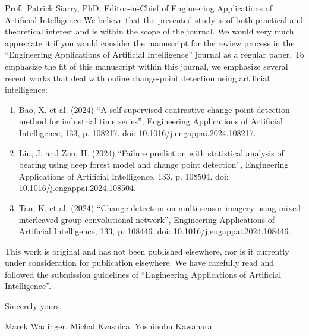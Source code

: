\documentclass{letter}
\begin{document}
\begin{letter}{Prof.~Patrick Siarry, PhD, Editor-in-Chief of Engineering Applications of Artificial Intelligence}
    We believe that the presented study is of both practical and theoretical interest and is within the scope of the journal. We would very much appreciate it if you would consider the manuscript for the review process in the ``Engineering Applications of Artificial Intelligence'' journal as a regular paper. To emphasize the fit of this manuscript within this journal, we emphasize several recent works that deal with online change-point detection using artificial intelligence:
    \begin{enumerate}
        \item Bao, X. et al. (2024) ``A self-supervised contrastive change point detection method for industrial time series'', Engineering Applications of Artificial Intelligence, 133, p. 108217. doi: 10.1016/j.engappai.2024.108217.
        \item Liu, J. and Zuo, H. (2024) ``Failure prediction with statistical analysis of bearing using deep forest model and change point detection'', Engineering Applications of Artificial Intelligence, 133, p. 108504. doi: 10.1016/j.engappai.2024.108504.
        \item Tan, K. et al. (2024) ``Change detection on multi-sensor imagery using mixed interleaved group convolutional network'', Engineering Applications of Artificial Intelligence, 133, p. 108446. doi: 10.1016/j.engappai.2024.108446.
    \end{enumerate}

    This work is original and has not been published elsewhere, nor is it currently under consideration for publication elsewhere. We have carefully read and followed the submission guidelines of ``Engineering Applications of Artificial Intelligence''.

    Sincerely yours,

    Marek Wadinger, Michal Kvasnica, Yoshinobu Kawahara

\end{letter}
\end{document}
